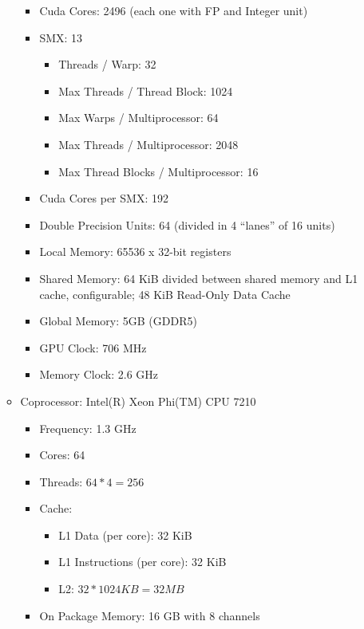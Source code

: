 \documentclass{article}
\begin{document}
\begin{appendices}
\begin{itemize}
\begin{itemize}
\begin{itemize}
                \item Cuda Cores: 2496 (each one with FP and Integer unit)
                \item SMX: 13
                \begin{itemize}
                    \item Threads / Warp: 32
                    \item Max Threads / Thread Block: 1024
                    \item Max Warps / Multiprocessor: 64
                    \item Max Threads / Multiprocessor: 2048
                    \item Max Thread Blocks / Multiprocessor: 16
                \end{itemize}
                \item Cuda Cores per SMX: 192
                \item Double Precision Units: 64 (divided in 4 ``lanes'' of 16 units)
                \item Local Memory: 65536 x 32-bit registers
                \item Shared Memory: 64 KiB divided between shared memory and L1 cache, configurable; 48 KiB Read-Only Data Cache
                \item Global Memory: 5GB (GDDR5)
                \item GPU Clock: 706 MHz
                \item Memory Clock: 2.6 GHz
            \end{itemize}
            \item Coprocessor: Intel(R) Xeon Phi(TM) CPU 7210 \cite{KNL}
            \begin{itemize}
                \item Frequency: 1.3 GHz
                \item Cores: 64
                \item Threads: $64*4 = 256$
                \item Cache:
                \begin{itemize}
                    \item L1 Data (per core): 32 KiB
                    \item L1 Instructions (per core): 32 KiB
                    \item L2: $32 * 1024 KB = 32MB$
                \end{itemize}
                \item On Package Memory: 16 GB with 8 channels
            \end{itemize}
        \end{itemize}
\end{itemize}


\end{appendices}
\end{document}
